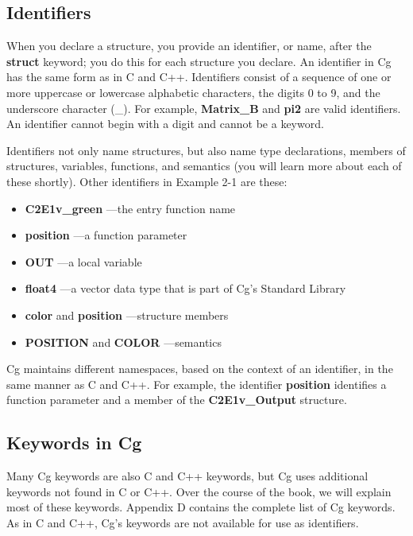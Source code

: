 \documentclass{book}
\begin{document}
\subsection{Identifiers}

When you declare a structure, you provide an identifier, or name, after the \textbf{struct} keyword; you do this for each structure you declare. An identifier in Cg has the same form as in C and C++. Identifiers consist of a sequence of one or more uppercase or lowercase alphabetic characters, the digits 0 to 9, and the underscore character (\_). For example, \textbf{Matrix\_B} and \textbf{pi2} are valid identifiers. An identifier cannot begin with a digit and cannot be a keyword.

Identifiers not only name structures, but also name type declarations, members of structures, variables, functions, and semantics (you will learn more about each of these shortly). Other identifiers in Example 2-1 are these:

\FloatBarrier
\begin{itemize}
\item \textbf{C2E1v\_green} —the entry function name
\item \textbf{position} —a function parameter
\item \textbf{OUT} —a local variable
\item \textbf{float4} —a vector data type that is part of Cg's Standard Library
\item \textbf{color} and \textbf{position} —structure members
\item \textbf{POSITION} and \textbf{COLOR} —semantics
\end{itemize}
\FloatBarrier

Cg maintains different namespaces, based on the context of an identifier, in the same manner as C and C++. For example, the identifier \textbf{position} identifies a function parameter and a member of the \textbf{C2E1v\_Output} structure.

\subsection*{Keywords in Cg}

Many Cg keywords are also C and C++ keywords, but Cg uses additional keywords not found in C or C++. Over the course of the book, we will explain most of these keywords. Appendix D contains the complete list of Cg keywords. As in C and C++, Cg's keywords are not available for use as identifiers.
\end{document}
